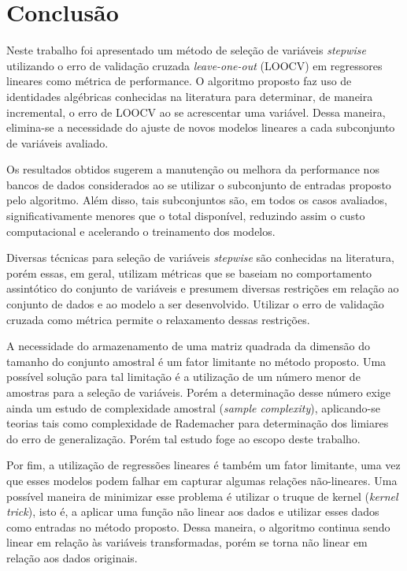\chapter[Conclusão]{Conclusão}

Neste trabalho foi apresentado um método de seleção de variáveis \textit{stepwise} utilizando o erro de validação cruzada \textit{leave-one-out} (LOOCV) em regressores lineares como métrica de performance. O algoritmo proposto faz uso de identidades algébricas conhecidas na literatura para determinar, de maneira incremental, o erro de LOOCV ao se acrescentar uma variável. Dessa maneira, elimina-se a necessidade do ajuste de novos modelos lineares a cada subconjunto de variáveis avaliado.

Os resultados obtidos sugerem a manutenção ou melhora da performance nos bancos de dados considerados ao se utilizar o subconjunto de entradas proposto pelo algoritmo. Além disso, tais subconjuntos são, em todos os casos avaliados, significativamente menores que o total disponível, reduzindo assim o custo computacional e acelerando o treinamento dos modelos.

Diversas técnicas para seleção de variáveis \textit{stepwise} são conhecidas na literatura, porém essas, em geral, utilizam métricas que se baseiam no comportamento assintótico do conjunto de variáveis e presumem diversas restrições em relação ao conjunto de dados e ao modelo a ser desenvolvido. Utilizar o erro de validação cruzada como métrica permite o relaxamento dessas restrições.

A necessidade do armazenamento de uma matriz quadrada da dimensão do tamanho do conjunto amostral é um fator limitante no método proposto. Uma possível solução para tal limitação é a utilização de um número menor de amostras para a seleção de variáveis. Porém a determinação desse número exige ainda um estudo de complexidade amostral (\textit{sample complexity}), aplicando-se teorias tais como complexidade de Rademacher para determinação dos limiares do erro de generalização. Porém tal estudo foge ao escopo deste trabalho.

Por fim, a utilização de regressões lineares é também um fator limitante, uma vez que esses modelos podem falhar em capturar algumas relações não-lineares. Uma possível maneira de minimizar esse problema é utilizar o truque de kernel (\textit{kernel trick})\cite{peaking_phenomenon}, isto é, a aplicar uma função não linear aos dados e utilizar esses dados como entradas no método proposto. Dessa maneira, o algoritmo continua sendo linear em relação às variáveis transformadas, porém se torna não linear em relação aos dados originais.